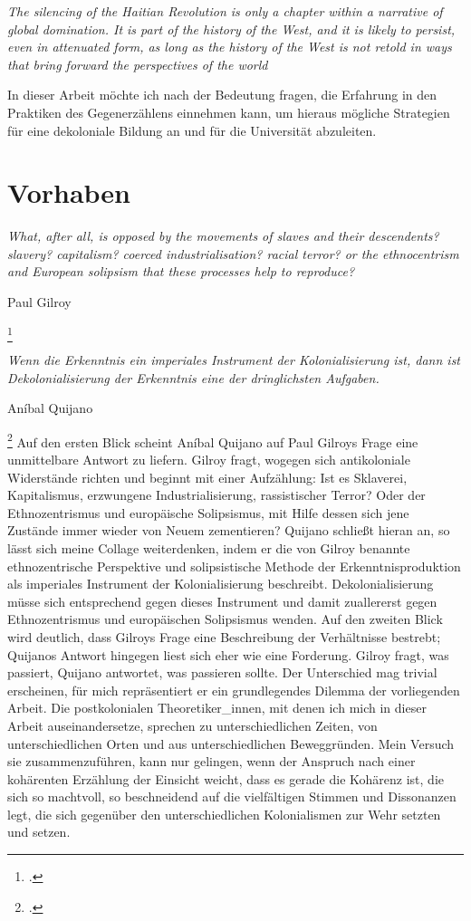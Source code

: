 \documentclass[11pt]{article}
\newenvironment{myenv}{\begin{adjustwidth}{2cm}{}}{\end{adjustwidth}}
\begin{document}
\begin{myenv}

  \textit{ \glqq The silencing of the Haitian Revolution is only a chapter within
    a narrative of global domination. It is part of the history of the West, and
    it is likely to persist, even in attenuated form, as long as the history of
    the West is not retold in ways that bring forward the perspectives of the
world \grqq \footnotemark {} } \end{myenv}

In dieser Arbeit möchte ich nach der Bedeutung fragen, die Erfahrung in den
Praktiken des Gegenerzählens einnehmen kann, um hieraus mögliche Strategien
für eine dekoloniale Bildung an und für die Universität abzuleiten.
\section{Vorhaben}
\epigraph{\textit{What, after all, is opposed by the movements of slaves and their descendents?
slavery? capitalism? coerced industrialisation? racial terror?
or the ethnocentrism and European solipsism that these processes help to reproduce?}}{Paul Gilroy \footnotemark} \footcitetext{gilroy}

\epigraph{\textit{Wenn die Erkenntnis ein imperiales Instrument der
Kolonialisierung ist, dann ist Dekolonialisierung der Erkenntnis eine der
dringlichsten Aufgaben.}}{Aníbal Quijano \footnotemark} \footcitetext{quijano}
Auf den ersten Blick scheint Aníbal Quijano auf Paul Gilroys Frage eine
unmittelbare Antwort zu liefern. Gilroy fragt, wogegen sich antikoloniale
Widerstände richten und beginnt mit einer Aufzählung: Ist es Sklaverei,
Kapitalismus, erzwungene Industrialisierung, rassistischer Terror? Oder der
Ethnozentrismus und europäische Solipsismus, mit Hilfe dessen sich jene Zustände
immer wieder von Neuem zementieren? Quijano schließt hieran an, so lässt sich
meine Collage weiterdenken, indem er die von Gilroy benannte ethnozentrische
Perspektive und solipsistische Methode der Erkenntnisproduktion als imperiales
Instrument der Kolonialisierung beschreibt. Dekolonialisierung müsse sich
entsprechend gegen dieses Instrument und damit zuallererst gegen Ethnozentrismus
und europäischen Solipsismus wenden.  Auf den zweiten Blick wird deutlich, dass
Gilroys Frage eine Beschreibung der Verhältnisse bestrebt; Quijanos Antwort
hingegen liest sich eher wie eine Forderung. Gilroy fragt, was passiert, Quijano
antwortet, was passieren sollte.  Der Unterschied mag trivial erscheinen, für
mich repräsentiert er ein grundlegendes Dilemma der vorliegenden Arbeit. Die
postkolonialen Theoretiker\_innen, mit denen ich mich in dieser Arbeit
auseinandersetze, sprechen zu unterschiedlichen Zeiten, von unterschiedlichen
Orten und aus unterschiedlichen Beweggründen. Mein Versuch sie zusammenzuführen,
kann nur gelingen, wenn der Anspruch nach einer kohärenten Erzählung der
Einsicht weicht, dass es gerade die Kohärenz ist, die sich so machtvoll, so
beschneidend auf die vielfältigen Stimmen und Dissonanzen legt, die sich
gegenüber den unterschiedlichen Kolonialismen zur Wehr setzten und setzen.
\end{document}
